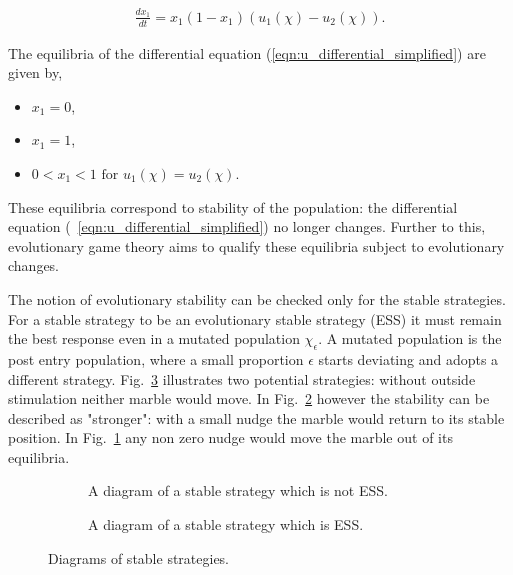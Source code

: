 \documentclass[10pt]{article}
\begin{document}
\begin{eqnarray}
	\label{eqn:u_differential_simplified}
	\frac{dx_1}{dt}= x_1(1 - x_1)(u_1(\chi) - u_2(\chi)).
\end{eqnarray}

The equilibria of the differential equation (\ref{eqn:u_differential_simplified})
are given by,

\begin{itemize}
	\item \(x_1=0\),
	\item \(x_1=1\),
	\item \(0<x_1<1 \mbox{ for } u_1(\chi)=u_2(\chi)\).
\end{itemize}

These equilibria correspond to stability of the population: the differential 
equation (~\ref{eqn:u_differential_simplified}) no longer changes. Further to
this, evolutionary game theory aims to qualify these equilibria subject to 
evolutionary changes.

The notion of evolutionary stability can be checked only for the stable strategies.
For a stable strategy to be an evolutionary stable strategy (ESS) it must remain 
the best response even in a mutated population \(\chi_\epsilon\). A mutated population is the post entry population, 
where a small proportion \(\epsilon\) starts deviating and adopts a different strategy.
Fig.~\ref{fig:stable_ess_driagrams} illustrates two potential strategies: without 
outside stimulation neither marble would move. In Fig.~\ref{fig:ess_diagram}
however the stability can be described as "stronger": with a small nudge the marble
would return to its stable position. In Fig.~\ref{fig:stable_diagram} any non zero
nudge would move the marble out of its equilibria.

\begin{figure}[!htbp]
\begin{center}
    \begin{subfigure}{0.40\textwidth}
	
	\caption{\label{fig:stable_diagram} A diagram of a stable strategy which 
	is not ESS.}
    \end{subfigure}
    \begin{subfigure}{0.40\textwidth}
	
	\caption{\label{fig:ess_diagram}A diagram of a stable strategy which is ESS.}
    \end{subfigure}
    	\caption{\label{fig:stable_ess_driagrams} Diagrams of stable strategies.}
\end{center}
\end{figure}
\end{document}
